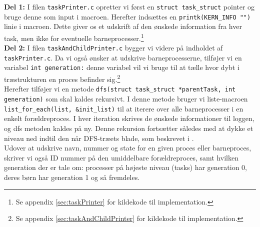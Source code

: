 \documentclass[main.tex]{subfile}
\begin{document}
\textbf{Del 1:} I filen \texttt{taskPrinter.c} opretter vi først en \texttt{struct task\_struct} pointer og bruge denne som input i macroen. Herefter indsættes en \texttt{printk(KERN\_INFO "")} linie i macroen. Dette giver os et udskrift af den ønskede information fra hver task, men ikke for eventuelle barneprocesser.\footnote{Se appendix \ref{sec:taskPrinter} for kildekode til implementation.}\\

\textbf{Del 2:} I filen \texttt{taskAndChildPrinter.c} bygger vi videre på indholdet af \texttt{taskPrinter.c}. Da vi også ønsker at udskrive barneprocesserne, tilføjer vi en variabel \texttt{int generation:} denne variabel vil vi bruge til at tælle hvor dybt i træstrukturen en proces befinder sig.\footnote{Se appendix \ref{sec:taskAndChildPrinter} for kildekode til implementation.}\\

Herefter tilføjer vi en metode \texttt{dfs(struct task\_struct *parentTask, int generation)} som skal kaldes rekursivt. I denne metode bruger vi liste-macroen \texttt{list\_for\_each(list, \&init\_list)} til at iterere over alle barneprocesser i en enkelt forældreproces. I hver iteration skrives de ønskede informationer til loggen, og dfs metoden kaldes på ny. Denne rekursion fortsætter således med at dykke et niveau ned indtil den når DFS-træets blade, som beskrevet i \cite[s.157, s.114]{SA:2013}.\\

Udover at udskrive navn, nummer og state for en given proces eller barneproces, skriver vi også ID nummer på den umiddelbare forældreproces, samt hvilken generation der er tale om: processer på højeste niveau (tasks) har generation 0, deres børn har generation 1 og så fremdeles.
\end{document}
